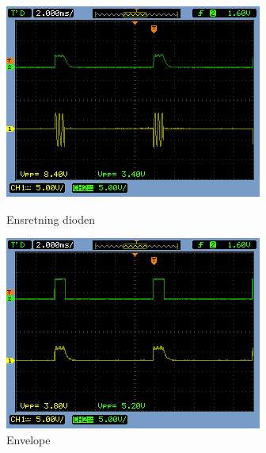 \begin{figure}[htb]
  \begin{minipage}{0.45\textwidth}
    \centering
	\includegraphics[width=\textwidth]{billeder/HWTest/Decoder/Decoder_ensretning}
		\caption{Ensretning dioden}
	\label{fig:Decoder_diode}
  \end{minipage}
  \hspace{0.1\textwidth}
  \begin{minipage}{0.45\textwidth}
    \centering
	\includegraphics[width=\textwidth]{billeder/HWTest/Decoder/Decoder_envelope}
		\caption{Envelope}
	\label{fig:Decoder_envelope}
  \end{minipage}
\end{figure}

